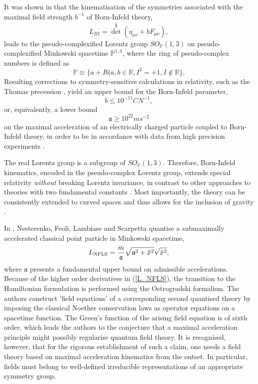 \documentclass[a4paper,aps,prd,showkeys,showpacs,superscriptaddress,preprint]{revtex4}
\newcommand{\pc}{\mathbb{P}}
\newcommand{\reals}{\mathbb{R}}
\begin{document}
It was shown in \cite{Schuller:2002rr,Schuller:2002fn} that the kinematisation of the
symmetries associated with the maximal field strength $b^{-1}$
 of Born-Infeld theory,
\begin{equation}\label{BIoriginal}
  L_{BI} = {\det}^\frac{1}{2}\left(\eta_{\mu\nu} + b
  F_{\mu\nu}\right),
\end{equation}
leads to the pseudo-complexified Lorentz group $SO_\pc(1,3)$ on
pseudo-complexified Minkowski spacetime $\pc^{1,3}$, where the ring of
pseudo-complex numbers is defined as
\begin{equation}
  \pc \equiv \{a+Ib | a,b \in \reals, I^2=+1, I\not\in \reals\}.
\end{equation}
Resulting corrections to symmetry-sensitive calculations in
relativity, such as the Thomas
precession \cite{Thomas}, yield an upper bound
\cite{Schuller:2002rr} for the Born-Infeld parameter,
\begin{equation}
  b \leq 10^{-11} C N^{-1},
\end{equation}
or, equivalently, a lower bound
\begin{equation}\label{maxaccel}
  \mathfrak{a} \geq 10^{22} m s^{-2}
\end{equation}
on the maximal acceleration
of an electrically charged particle coupled to Born-Infeld theory, in
order to be in accordance with data from high precision
experiments \cite{Newman}. 

The real Lorentz group is a subgroup of $SO_\pc(1,3)$. Therefore, 
Born-Infeld kinematics, encoded in the pseudo-complex Lorentz group,
extends special relativity \textsl{without} breaking Lorentz invariance, in contrast to other
approaches to theories with two fundamental constants
\cite{Amelino-Camelia:2002wr,Kowalski-Glikman:2002ft}. 
Most importantly, the theory can be consistently
extended to curved spaces \cite{Yano1973} and thus allows for the
inclusion of gravity
\cite{Schuller:2002rr,Schuller:2002fn}.

In \cite{Nesterenko:1998jt}, Nesterenko, Feoli, Lambiase and Scarpetta
quantise a submaximally accelerated classical point particle in
Minkowski spacetime,
\begin{equation}\label{L_NFLS}
  L_{\small\textrm{NFLS}} = \frac{m}{\mathfrak{a}} \sqrt{\mathfrak{a}^2+{\ddot x}^2}\sqrt{\dot x^2},
\end{equation}
where $\mathfrak{a}$ presents a fundamental upper bound on admissible
accelerations. Because of the higher order derivatives in (\ref{L_NFLS}),
the transition to the Hamiltonian formulation is performed
using the Ostrogradski formalism.
The authors construct 'field equations' of a corresponding second quantised
theory by imposing the classical Noether conservation laws as operator
equations 
on a spacetime function. The Green's function of the arising field equation
is of sixth order, which  leads the authors to the conjecture that a
maximal acceleration principle might possibly regularise quantum field theory.
It is recognised, however, that for the rigorous establishment of such a claim, one needs a field theory based on maximal acceleration kinematics from
the outset. In particular, fields must belong to well-defined
irreducible representations of an appropriate symmetry group.\\ 
\end{document}
